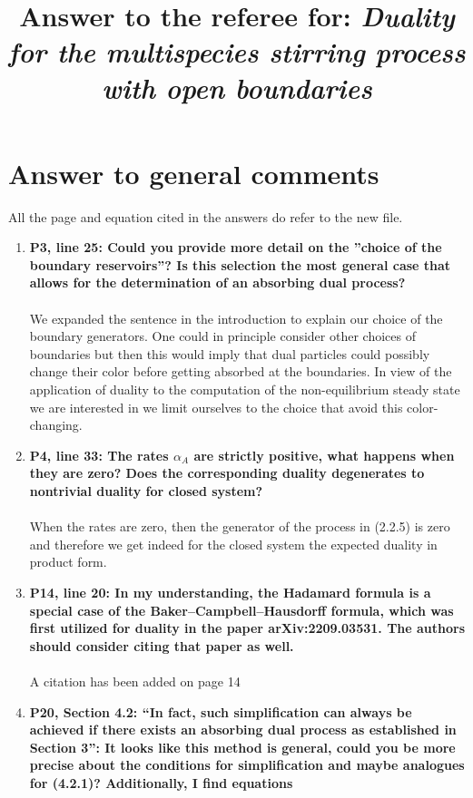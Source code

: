 \documentclass[10pt]{article}
\title{Answer to the referee for: \textit{Duality for the multispecies stirring process with open boundaries}}
\numberwithin{equation}{section}
\numberwithin{equation}{subsection}
\begin{document}
		\maketitle
		\section*{Answer to general comments}
		All the page and equation cited in the answers do refer to the new file. 
		\begin{enumerate}
			\item \textbf{P3, line 25: Could you provide more detail on the ”choice of the boundary reservoirs”? Is this selection
				the most general case that allows for the determination of an absorbing dual process?}\\ \\
				We expanded the sentence in the introduction to explain our choice of the boundary generators. One could in principle consider other choices of boundaries but then this would imply that dual particles could possibly change their color before getting absorbed at the boundaries. In view of the application of duality to the computation of the non-equilibrium steady state we are interested in we limit ourselves to the choice that avoid this color-changing.
				\item \textbf{P4, line 33: The rates $\alpha_{A}$ are strictly positive, what happens when they are zero? Does the corresponding duality degenerates to nontrivial duality for closed system?} \\ \\
					When the rates are zero, then the generator of the process in (2.2.5) is zero and therefore we get indeed for the closed system the expected duality in product form.
					\item \textbf{P14, line 20: In my understanding, the Hadamard formula is a special case of the Baker–Campbell–Hausdorff
						formula, which was first utilized for duality in the paper arXiv:2209.03531. The authors should consider
						citing that paper as well.}\\ \\
						A citation has been added on page 14
						\item \textbf{P20, Section 4.2: “In fact, such simplification can always be achieved if there exists an absorbing dual
							process as established in Section 3”: It looks like this method is general, could you be more precise
							about the conditions for simplification and maybe analogues for (4.2.1)? Additionally, I find equations
}
\end{enumerate}
\end{document}
